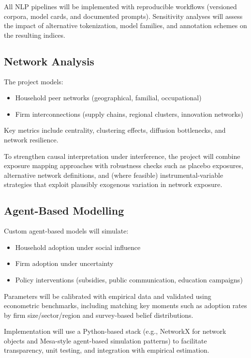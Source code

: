 \documentclass{nfr}
\begin{document}
All NLP pipelines will be implemented with reproducible workflows (versioned corpora, model cards, and documented prompts). Sensitivity analyses will assess the impact of alternative tokenization, model families, and annotation schemes on the resulting indices.

\subsection{Network Analysis}

The project models:

\begin{itemize}
\item Household peer networks (geographical, familial, occupational)
\item Firm interconnections (supply chains, regional clusters, innovation networks)
\end{itemize}

Key metrics include centrality, clustering effects, diffusion bottlenecks, and network resilience.

To strengthen causal interpretation under interference, the project will combine exposure mapping approaches with robustness checks such as placebo exposures, alternative network definitions, and (where feasible) instrumental-variable strategies that exploit plausibly exogenous variation in network exposure.

\subsection{Agent-Based Modelling}

Custom agent-based models will simulate:

\begin{itemize}
\item Household adoption under social influence
\item Firm adoption under uncertainty
\item Policy interventions (subsidies, public communication, education campaigns)
\end{itemize}

Parameters will be calibrated with empirical data and validated using econometric benchmarks, including matching key moments such as adoption rates by firm size/sector/region and survey-based belief distributions.

Implementation will use a Python-based stack (e.g., NetworkX for network objects and Mesa-style agent-based simulation patterns) to facilitate transparency, unit testing, and integration with empirical estimation.
\end{document}
